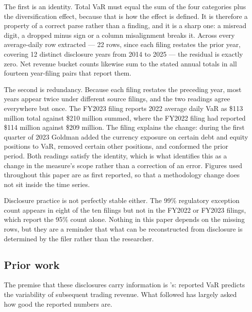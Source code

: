 The first is an identity. Total VaR must equal the sum of the four categories
plus the diversification effect, because that is how the effect is defined. It
is therefore a property of a correct parse rather than a finding, and it is a
sharp one: a misread digit, a dropped minus sign or a column misalignment
breaks it. Across every average-daily row extracted --- 22 rows, since each
filing restates the prior year, covering 12 distinct disclosure years from 2014
to 2025 --- the residual is exactly zero. Net revenue bucket counts likewise sum
to the stated annual totals in all fourteen year-filing pairs that report them.

The second is redundancy. Because each filing restates the preceding year,
most years appear twice under different source filings, and the two readings
agree everywhere but once. The FY2023 filing reports 2022 average daily VaR as
\$113 million total against \$210 million summed, where the FY2022 filing had
reported \$114 million against \$209 million. The filing explains the change:
during the first quarter of 2023 Goldman added the currency exposure on certain
debt and equity positions to VaR, removed certain other positions, and
conformed the prior period. Both readings satisfy the identity, which is what
identifies this as a change in the measure's scope rather than a correction of
an error. Figures used throughout this paper are as first reported, so that a
methodology change does not sit inside the time series.

Disclosure practice is not perfectly stable either. The 99\% regulatory
exception count appears in eight of the ten filings but not in the FY2022 or
FY2023 filings, which report the 95\% count alone. Nothing in this paper
depends on the missing rows, but they are a reminder that what can be
reconstructed from disclosure is determined by the filer rather than the
researcher.

\subsection{Prior work}

The premise that these disclosures carry information is
\citet{jorion2002informative}'s: reported VaR predicts the variability of
subsequent trading revenue. What followed has largely asked how good the
reported numbers are.

